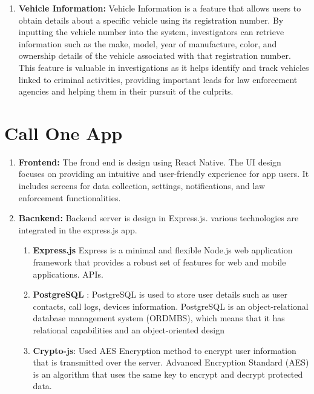 \begin{enumerate}[label=\roman*.]
\begin{enumerate}[label=\arabic*.]
        \item \textbf{Vehicle Information:} Vehicle Information is a feature that allows users to obtain details about a specific vehicle using its registration number. By inputting the vehicle number into the system, investigators can retrieve information such as the make, model, year of manufacture, color, and ownership details of the vehicle associated with that registration number. This feature is valuable in investigations as it helps identify and
        track vehicles linked to criminal activities, providing important leads for law enforcement agencies and helping them in their pursuit of the culprits.
    \end{enumerate}
    
\end{enumerate}

\section{Call One App}

\begin{enumerate}[label=\roman*.]
    \item \textbf{Frontend:} The frond end is design using React Native. The UI design focuses on providing an intuitive and user-friendly experience for app users. It includes screens for data collection, settings, notifications, and law enforcement functionalities.
    
    \item \textbf{Bacnkend:} Backend server is design in Express.js. various technologies are integrated in the express.js app.
    
    \begin{enumerate}[label=\arabic*.]
        \item \textbf{Express.js} Express is a minimal and flexible Node.js web application framework that provides a robust set of features for web and mobile applications. APIs.
        
        \item \textbf{PostgreSQL} : PostgreSQL is used to store user details such as user contacts, call logs, devices information. PostgreSQL is an object-relational database management system (ORDMBS), which means that it has relational capabilities and an object-oriented design
        
        \item \textbf{Crypto-js}: Used AES Encryption method to encrypt user information that is transmitted over the server. Advanced Encryption Standard (AES) is an algorithm that uses the same key to encrypt and decrypt protected data. 
    \end{enumerate}
    
\end{enumerate}